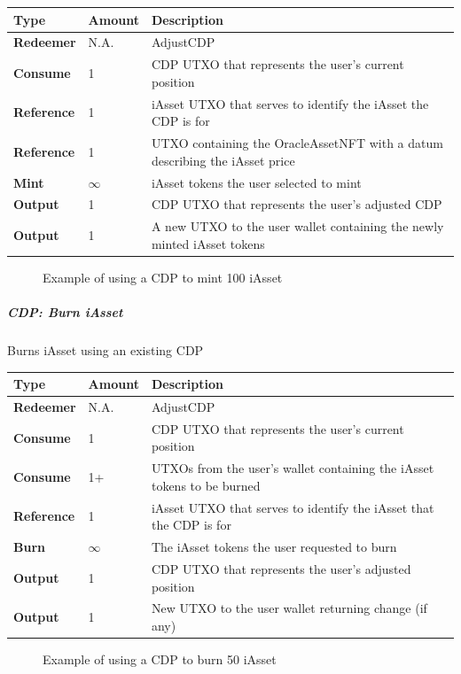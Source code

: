 \documentclass{article}
\begin{document}
\begin{sloppypar}
\begin{tabularx}{\linewidth}{l|l|L}
\toprule
\textbf{Type} & \textbf{Amount} & \textbf{Description}
\tabularnewline
\midrule
\endhead
\textbf{Redeemer} & N.A. & AdjustCDP
\tabularnewline
\midrule
\textbf{Consume} & 1 & CDP UTXO that represents the user's current
position
\tabularnewline
\midrule
\textbf{Reference} & 1 & iAsset UTXO that serves to identify the iAsset
the CDP is for
\tabularnewline
\midrule
\textbf{Reference} & 1 & UTXO containing the OracleAssetNFT with a datum
describing the iAsset price
\tabularnewline
\midrule
\textbf{Mint} & \(\infty\) & iAsset tokens the user selected to
mint
\tabularnewline
\midrule
\textbf{Output} & 1 & CDP UTXO that represents the user's adjusted
CDP
\tabularnewline
\midrule
\textbf{Output} & 1 & A new UTXO to the user wallet containing the newly
minted iAsset tokens
\tabularnewline
\bottomrule
\end{tabularx}

\hypertarget{cdp-mint-iasset-figure}{%
\begin{figure}[htbp]
\centering

\caption{Example of using a CDP to mint 100 iAsset}
\label{cdp-mint-iasset-figure}
\end{figure}}

\hypertarget{cdp-burn-iasset}{%
\subparagraph{CDP: Burn iAsset}\label{cdp-burn-iasset}}

Burns iAsset using an existing CDP

\begin{tabularx}{\linewidth}{l|l|L}
\toprule
\textbf{Type} & \textbf{Amount} & \textbf{Description}
\tabularnewline
\midrule
\endhead
\textbf{Redeemer} & N.A. & AdjustCDP
\tabularnewline
\midrule
\textbf{Consume} & 1 & CDP UTXO that represents the user's current
position
\tabularnewline
\midrule
\textbf{Consume} & 1+ & UTXOs from the user's wallet containing the
iAsset tokens to be burned
\tabularnewline
\midrule
\textbf{Reference} & 1 & iAsset UTXO that serves to identify the iAsset
that the CDP is for
\tabularnewline
\midrule
\textbf{Burn} & \(\infty\) & The iAsset tokens the user requested to
burn
\tabularnewline
\midrule
\textbf{Output} & 1 & CDP UTXO that represents the user's adjusted
position
\tabularnewline
\midrule
\textbf{Output} & 1 & New UTXO to the user wallet returning change (if
any)
\tabularnewline
\bottomrule
\end{tabularx}

\hypertarget{cdp-burn-iasset-figure}{%
\begin{figure}[htbp]
\centering

\caption{Example of using a CDP to burn 50 iAsset}
\label{cdp-burn-iasset-figure}
\end{figure}}


\end{sloppypar}
\end{document}
